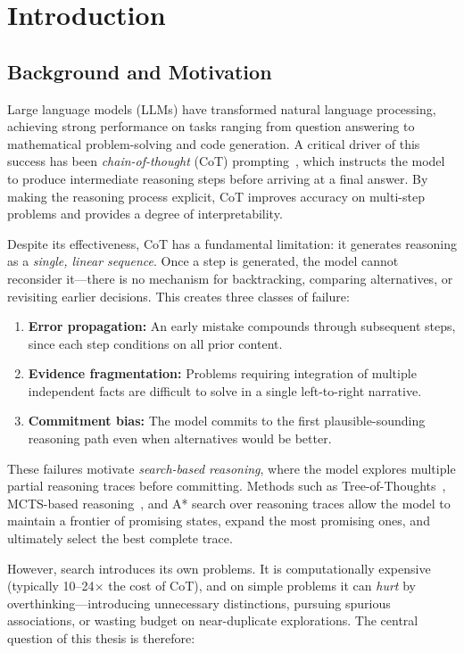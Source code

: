 \chapter{Introduction}

\section{Background and Motivation}

Large language models (LLMs) have transformed natural language processing, achieving strong performance on tasks ranging from question answering to mathematical problem-solving and code generation. A critical driver of this success has been \emph{chain-of-thought} (CoT) prompting~\citep{wei2022chain}, which instructs the model to produce intermediate reasoning steps before arriving at a final answer. By making the reasoning process explicit, CoT improves accuracy on multi-step problems and provides a degree of interpretability.

Despite its effectiveness, CoT has a fundamental limitation: it generates reasoning as a \emph{single, linear sequence}. Once a step is generated, the model cannot reconsider it---there is no mechanism for backtracking, comparing alternatives, or revisiting earlier decisions. This creates three classes of failure:

\begin{enumerate}
\item \textbf{Error propagation:} An early mistake compounds through subsequent steps, since each step conditions on all prior content.
\item \textbf{Evidence fragmentation:} Problems requiring integration of multiple independent facts are difficult to solve in a single left-to-right narrative.
\item \textbf{Commitment bias:} The model commits to the first plausible-sounding reasoning path even when alternatives would be better.
\end{enumerate}

These failures motivate \emph{search-based reasoning}, where the model explores multiple partial reasoning traces before committing. Methods such as Tree-of-Thoughts~\citep{yao2024tree}, MCTS-based reasoning~\citep{hao2023reasoning}, and A* search over reasoning traces allow the model to maintain a frontier of promising states, expand the most promising ones, and ultimately select the best complete trace.

However, search introduces its own problems. It is computationally expensive (typically 10--24$\times$ the cost of CoT), and on simple problems it can \emph{hurt} by overthinking---introducing unnecessary distinctions, pursuing spurious associations, or wasting budget on near-duplicate explorations. The central question of this thesis is therefore:

